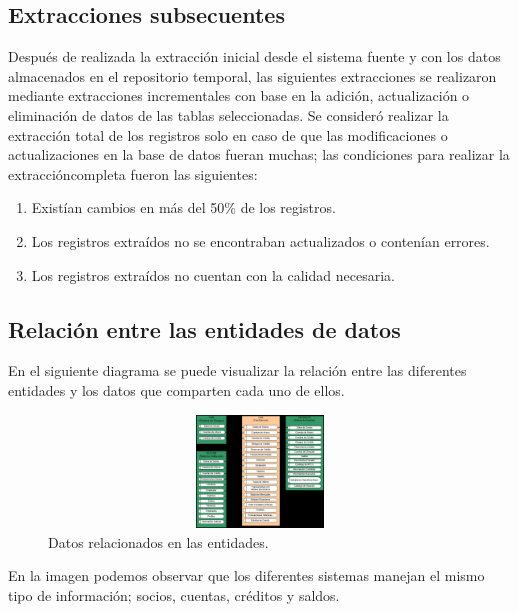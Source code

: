\subsection{Extracciones subsecuentes}

Después de realizada la extracción inicial desde el sistema fuente y con los
datos almacenados en el repositorio temporal, las siguientes extracciones se
realizaron mediante extracciones incrementales con base en la adición,
actualización o eliminación de datos de las tablas seleccionadas. Se consideró
realizar la extracción total de los registros solo en caso de que las
modificaciones o actualizaciones en la base de datos fueran muchas; las
condiciones para realizar la extraccióncompleta fueron las siguientes:

\begin{enumerate}
\item Existían cambios en más del 50\% de los registros.
\item Los registros extraídos no se encontraban actualizados o contenían
  errores.
\item Los registros extraídos no cuentan con la calidad necesaria.
\end{enumerate}

\subsection{Relación entre las entidades de datos}

En el siguiente diagrama se puede visualizar la relación entre las diferentes
entidades y los datos que comparten cada uno de ellos.

\begin{figure}[htb]
  \begin{center}
    \includegraphics[width=12cm, height=3cm, scale=0.5]{Relacion_entidades.jpg}
        \caption{Datos relacionados en las entidades.}
    \label{fig:datos-relacionados-en-las-entidades}
  \end{center}
\end{figure}

En la imagen podemos observar que los diferentes sistemas manejan el mismo tipo
de información; socios, cuentas, créditos y saldos.

